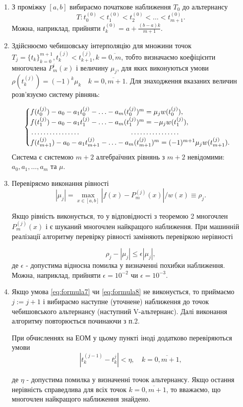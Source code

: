\documentclass[ukrainian,14pt]{extarticle}
\def\ab{[a,b]}
\begin{document}
\begin{enumerate}
	\item З проміжку $\ab$ вибираємо початкове наближення $T_0$ до альтернансу
	$$T: t^{(0)}_{0} < t^{(0)}_{1} < t^{(0)}_{2} < \ldots < t^{(0)}_{m+1}.$$
	Можна, наприклад, прийняти $t^{(0)}_k = a + \frac{(b-a)k}{m+1}$.
	
	\item Здійснюємо чебишовську інтерполяцію для множини точок  \\ $T_j = \{t_k\}_{k=0}^{m+1}, t^{(j)}_k < t^{(j)}_{k+1}, k=\overline{0,m}$, тобто визначаємо коефіцієнти многочлена $P^{i}_m(x)$ і величину $\mu_j$, для яких виконуються умови $\rho(t^{(j)}_k) = (-1)^{k} \mu_k \quad k = \overline{0, m+1}$. Для знаходження вказаних величин розв'язуємо систему рівнянь:

\begin{equation}\label{eq:formula6}
\begin{cases}
f(t^{(j)}_0) - a_0 - a_1t^{(j)}_0 - \ldots - a_m(t_0^{(j)})^m=\mu_jw(t_0^{(j)}), \\
f(t^{(j)}_1)-a_0-a_1t^{(j)}_1 - \ldots - a_m(t^{(j)}_1)^m = - \mu_jw(t^{(j)}_1),\\
\dotfill\hfill\hbox{} \dotfill\hfill\hbox{}\\
f(t^{(j)}_{m+1}) -a_0 -a_1t^{(j)}_{m+1} - \ldots - a_m(t^{(j)}_{m+1})^m = (-1)^{m+1}\mu_jw(t^{(j)}_{m+1}).
\end{cases}
\end{equation}
$$$$
Система є системою $m+2$ алгебраїчних рівнянь з $m+2$ невідомими: $a_0, a_1, \ldots ,a_m$ та $\mu$.

\item Перевіряємо виконання рівності
\
\begin{equation}\label{eq:formula7}
|\mu_j| = \max_{x \in [a,b]} |f(x) - P^{(j)}_m(x)| / w(x) \equiv \rho_j.
\end{equation}

Якщо рівність виконується, то у відповідності з теоремою 2 многочлен $P^{(j)}_m(x)$ і є шуканий многочлен найкращого наближення. При машинній реалізації алгоритму перевірку рівності заміняють перевіркою нерівності

\begin{equation}\label{eq:formula8}
\rho_j - |\mu_j|\leq \epsilon|\mu_j|,
\end{equation}
де $\epsilon$ - допустима відносна помилка у визначенні похибки наближення. Можна, наприклад, прийняти $\epsilon = 10^{-2}$ чи $\epsilon = 10^{-3}$.
\item
Якщо умова \ref{eq:formula7} чи \ref{eq:formula8} не виконується, то приймаємо $j:=j+1$ і вибираємо наступне (уточнене) наближення до точок чебишовського альтернансу (наступний V-альтернанс). Далі виконання алгоритму повторюється починаючи з п.2.

При обчисленнях на ЕОМ у цьому пункті іноді додатково перевіряються умови
$$\left|t^{(j-1)}_k - t^{j}_k\right| < \eta, \quad k = \overline{0, m+1},$$

де $\eta$ - допустима помилка у визначенні точок альтернансу. Якщо остання нерівність справедлива для всіх точок $k = \overline{0, m+1}$, то вважаємо, що многочлен найкращого наближення знайдено.

\end{enumerate}
\end{document}
